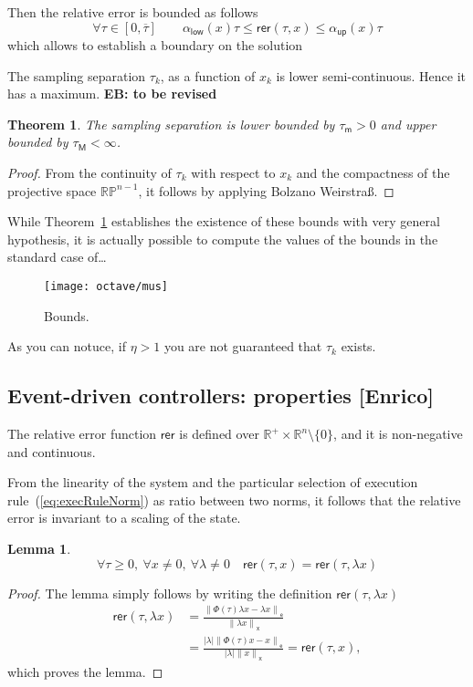 \documentclass[12pt,draftcls,onecolumn]{IEEEtran} %
\newtheorem{lemma}{Lemma}
\newtheorem{theorem}{Theorem}
\newcommand{\nE}[1]{\left\|#1\right\|_{\mathsf e}}
\newcommand{\nX}[1]{\left\|#1\right\|_{\mathsf x}}
\newcommand{\RR}{\mathbb{R}}
\begin{document}
Then the relative error is bounded as follows
\begin{equation}
  \label{eq:rerBounds}
  \forall\tau\in[0,\overline\tau]\qquad
  \alpha_\mathsf{low}(x)\tau\leq\mathsf{rer}(\tau,x)\leq\alpha_\mathsf{up}(x)\tau
\end{equation}
which allows to establish a boundary on the solution 

The sampling separation $\tau_k$, as a function of $x_k$ is lower
semi-continuous. Hence it has a maximum. \textbf{EB: to be revised}

\begin{theorem}
  The sampling separation is lower bounded by $\tau_{\mathsf{m}}>0$
  and upper bounded by $\tau_{\mathsf{M}}<\infty$.
  \label{th:lowUpBounds}
\end{theorem}
\begin{proof}
  From the continuity of $\tau_k$ with respect to $x_k$ 
  and the compactness of the projective space $\RR\mathbb{P}^{n-1}$, it
  follows by applying Bolzano Weirstra\ss.
\end{proof}

While Theorem~\ref{th:lowUpBounds} establishes the existence of these
bounds with very general hypothesis, it is actually possible to
compute the values of the bounds in the standard case of\dots

\begin{figure}
  \centering
  \texttt{[image: octave/mus]}
  \caption{Bounds.}
  \label{fig:mus}
\end{figure}

As you can notuce, if $\eta>1$ you are not guaranteed that $\tau_k$
exists.

\subsection{Event-driven controllers: properties [Enrico]}
\label{sec:eventProp}

The relative error function $\mathsf{rer}$ is defined over
$\RR^+\times\RR^n\setminus\{0\}$, and it is non-negative and
continuous.

From the linearity of the system and the particular selection of
execution rule~(\ref{eq:execRuleNorm}) as ratio between two norms, it
follows that the relative error is invariant to a scaling of the
state.
\begin{lemma}
  \begin{equation}
    \label{eq:scaling}
    \forall \tau\geq 0,\ \forall x\neq 0,\ \forall \lambda\neq 0\quad
    \mathsf{rer}(\tau,x)=\mathsf{rer}(\tau,\lambda x)
  \end{equation}
 \label{lem:scalingOK}
\end{lemma}
\begin{proof}
  The lemma simply follows by writing the definition
  $\mathsf{rer}(\tau,\lambda x)$
  \begin{align*}
    \mathsf{rer}(\tau,\lambda x) 
    & = \frac{\nE{\Phi(\tau)\lambda x-\lambda x}}{\nX{\lambda x}} \\
    & = \frac{|\lambda|\nE{\Phi(\tau)x- x}}{|\lambda|\nX{x}}
    = \mathsf{rer}(\tau,x),
  \end{align*}
  which proves the lemma.
\end{proof}
\end{document}
